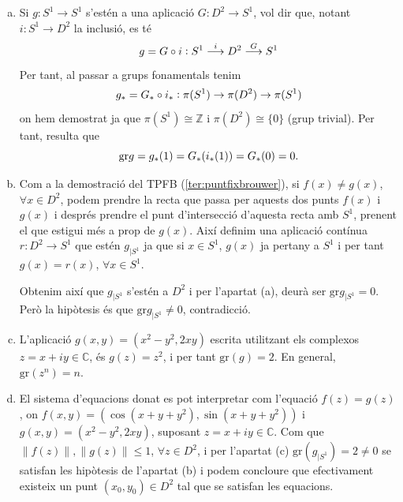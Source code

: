 \documentclass[../main.tex]{subfiles}
\begin{document}
\begin{sol}
\begin{enumerate}[(a)]
    \item Si $g:S^1\rightarrow S^1$ s'estén a una aplicació $G:D^2\rightarrow S^1$, vol dir que, notant $i:S^1\rightarrow D^2$ la inclusió, es té
    \begin{equation}
        \notag
        g = G\circ i:S^1\overset{i}{\longrightarrow}D^2\overset{G}{\longrightarrow}S^1
    \end{equation}
    Per tant, al passar a grups fonamentals tenim
    \begin{equation}
        \notag
        g_* = G_*\circ i_*:\pi(S^1)\rightarrow \pi(D^2)\rightarrow\pi (S^1)
    \end{equation}
    on hem demostrat ja que $\pi(S^1)\cong \mathbb{Z}$ i $\pi(D^2)\cong \{0\}$ (grup trivial). Per tant, resulta que 
    \begin{equation}
        \notag
        \mathrm{gr}g = g_*(1)=G_*(i_*(1))=G_*(0)=0.
    \end{equation}
    \item Com a la demostració del TPFB (\ref{ter:puntfixbrouwer}), si $f(x)\not=g(x)$, $\forall x\in D^2$, podem prendre la recta que passa per aquests dos punts $f(x)$ i $g(x)$ i després prendre el punt d'intersecció d'aquesta recta amb $S^1$, prenent el que estigui més a prop de $g(x)$. Així definim una aplicació contínua $r:D^2\rightarrow S^1$ que estén $g_{|S^1}$ ja que si $x\in S^1$, $g(x)$ ja pertany a $S^1$ i per tant $g(x)=r(x)$, $\forall x\in S^1$.
    
    Obtenim així que $g_{|S^1}$ s'estén a $D^2$ i per l'apartat (a), deurà ser $\mathrm{gr}g_{|S^1}=0$. Però la hipòtesis és que $\mathrm{gr}g_{|S^1}\not=0$, contradicció.
    \item L'aplicació $g(x,y) = (x^2-y^2,2xy)$ escrita utilitzant els complexos $z = x+iy\in\mathbb{C}$, és $g(z) = z^2$, i per tant $\mathrm{gr}(g)=2$. En general, $\mathrm{gr}(z^n) = n$.
    
    \item El sistema d'equacions donat es pot interpretar com l'equació $f(z) = g(z)$, on $f(x,y) = (\cos(x+y+y^2),\sin(x+y+y^2))$ i $g(x,y) = (x^2-y^2,2xy)$, suposant $z=x+iy\in\mathbb{C}$. Com que $\|f(z)\|,\|g(z)\|\leq 1$, $\forall z\in D^2$, i per l'apartat (c) $\mathrm{gr}(g_{|S^1})=2\not=0$ se satisfan les hipòtesis de l'apartat (b) i podem concloure que efectivament existeix un punt $(x_0,y_0)\in D^2$ tal que se satisfan les equacions.
\end{enumerate}
\end{sol}
\end{document}
